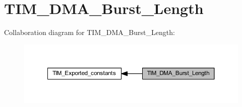 \hypertarget{group___t_i_m___d_m_a___burst___length}{}\section{T\+I\+M\+\_\+\+D\+M\+A\+\_\+\+Burst\+\_\+\+Length}
\label{group___t_i_m___d_m_a___burst___length}
Collaboration diagram for T\+I\+M\+\_\+\+D\+M\+A\+\_\+\+Burst\+\_\+\+Length\+:
\nopagebreak
\begin{figure}[H]
\begin{center}
\leavevmode
\includegraphics[width=350pt]{group___t_i_m___d_m_a___burst___length}
\end{center}
\end{figure}
